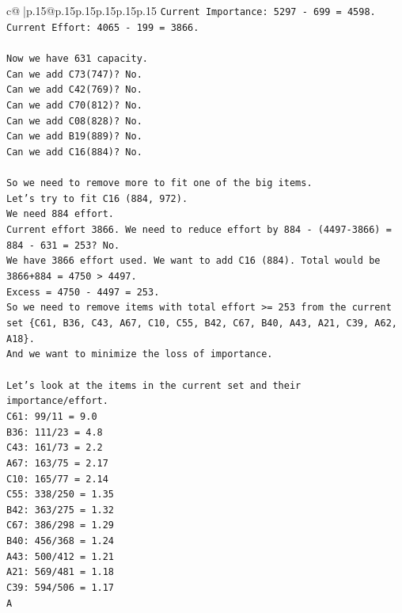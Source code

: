 \documentclass{article}
\begin{document}
{\begin{supertabular}{c@{$\;$}|p{.15\linewidth}@{}p{.15\linewidth}p{.15\linewidth}p{.15\linewidth}p{.15\linewidth}p{.15\linewidth}}
{{{\texttt{Current Importance: 5297 {-} 699 = 4598.} \\
\texttt{Current Effort: 4065 {-} 199 = 3866.} \\
\\ 
\texttt{Now we have 631 capacity.} \\
\texttt{Can we add C73(747)? No.} \\
\texttt{Can we add C42(769)? No.} \\
\texttt{Can we add C70(812)? No.} \\
\texttt{Can we add C08(828)? No.} \\
\texttt{Can we add B19(889)? No.} \\
\texttt{Can we add C16(884)? No.} \\
\\ 
\texttt{So we need to remove more to fit one of the big items.} \\
\texttt{Let's try to fit C16 (884, 972).} \\
\texttt{We need 884 effort.} \\
\texttt{Current effort 3866. We need to reduce effort by 884 {-} (4497{-}3866) = 884 {-} 631 = 253? No.} \\
\texttt{We have 3866 effort used. We want to add C16 (884). Total would be 3866+884 = 4750 > 4497.} \\
\texttt{Excess = 4750 {-} 4497 = 253.} \\
\texttt{So we need to remove items with total effort >= 253 from the current set \{C61, B36, C43, A67, C10, C55, B42, C67, B40, A43, A21, C39, A62, A18\}.} \\
\texttt{And we want to minimize the loss of importance.} \\
\\ 
\texttt{Let's look at the items in the current set and their importance/effort.} \\
\texttt{C61: 99/11 = 9.0} \\
\texttt{B36: 111/23 = 4.8} \\
\texttt{C43: 161/73 = 2.2} \\
\texttt{A67: 163/75 = 2.17} \\
\texttt{C10: 165/77 = 2.14} \\
\texttt{C55: 338/250 = 1.35} \\
\texttt{B42: 363/275 = 1.32} \\
\texttt{C67: 386/298 = 1.29} \\
\texttt{B40: 456/368 = 1.24} \\
\texttt{A43: 500/412 = 1.21} \\
\texttt{A21: 569/481 = 1.18} \\
\texttt{C39: 594/506 = 1.17} \\
\texttt{A} \\
            }
        }
    }
     \\ \\


\end{supertabular}}
\end{document}

